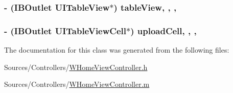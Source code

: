 \hypertarget{interface_w_home_view_controller_a2945bdd6a49199f1d57aeb2ca69efc7a}{
\subsubsection[{table\-View}]{\setlength{\rightskip}{0pt plus 5cm}-\/ (I\-B\-Outlet U\-I\-Table\-View$\ast$) table\-View\hspace{0.3cm}{\ttfamily [read]}, {\ttfamily [write]}, {\ttfamily [nonatomic]}, {\ttfamily [retain]}}}\label{interface_w_home_view_controller_a2945bdd6a49199f1d57aeb2ca69efc7a}
\hypertarget{interface_w_home_view_controller_a326e532c02caf1a11cba9650d84c8920}{
\subsubsection[{upload\-Cell}]{\setlength{\rightskip}{0pt plus 5cm}-\/ (I\-B\-Outlet U\-I\-Table\-View\-Cell$\ast$) upload\-Cell\hspace{0.3cm}{\ttfamily [read]}, {\ttfamily [write]}, {\ttfamily [nonatomic]}, {\ttfamily [retain]}}}\label{interface_w_home_view_controller_a326e532c02caf1a11cba9650d84c8920}


The documentation for this class was generated from the following files\-:\begin{DoxyCompactItemize}
\item 
Sources/\-Controllers/\hyperlink{_w_home_view_controller_8h}{W\-Home\-View\-Controller.\-h}\item 
Sources/\-Controllers/\hyperlink{_w_home_view_controller_8m}{W\-Home\-View\-Controller.\-m}\end{DoxyCompactItemize}
